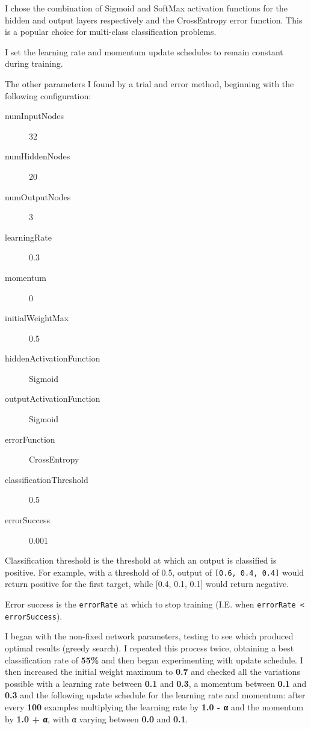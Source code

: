 \documentclass[a4paper]{article}
\begin{document}
I chose the combination of Sigmoid and SoftMax activation functions for the hidden and output layers respectively and the CrossEntropy error function. This is a popular choice for multi-class classification problems.

I set the learning rate and momentum update schedules to remain constant during training.

The other parameters I found by a trial and error method, beginning with the following configuration:

\begin{description}
\item[numInputNodes] 32
\item[numHiddenNodes] 20
\item[numOutputNodes] 3
\item[learningRate] 0.3
\item[momentum] 0
\item[initialWeightMax] 0.5
\item[hiddenActivationFunction] Sigmoid
\item[outputActivationFunction] Sigmoid
\item[errorFunction] CrossEntropy
\item[classificationThreshold] 0.5
\item[errorSuccess] 0.001
\end{description}

Classification threshold is the threshold at which an output is classified is positive. For example, with a threshold of 0.5, output of \lstinline{[0.6, 0.4, 0.4]} would return positive for the first target, while [0.4, 0.1, 0.1] would return negative.

Error success is the \lstinline{errorRate} at which to stop training (I.E. when \lstinline{errorRate < errorSuccess}).

I began with the non-fixed network parameters, testing to see which produced optimal results (greedy search). I repeated this process twice, obtaining a best classification rate of \textbf{55\%} and then began experimenting with update schedule. 
I then increased the initial weight maximum to \textbf{0.7} and checked all the variations possible with a learning rate between \textbf{0.1} and \textbf{0.3}, a momentum between \textbf{0.1} and \textbf{0.3} and the following update schedule for the learning rate and momentum: after every \textbf{100} examples multiplying the learning rate by \textbf{1.0 - α} and the momentum by \textbf{1.0 + α}, with α varying between \textbf{0.0} and \textbf{0.1}.
\end{document}

